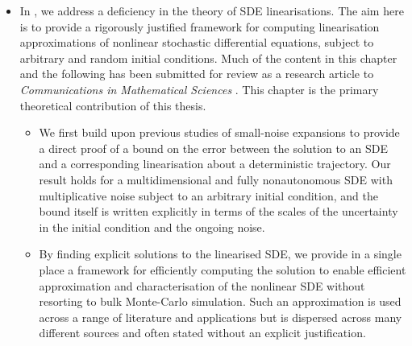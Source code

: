 \begin{itemize}
	\item In , we address a deficiency in the theory of SDE linearisations. %
	      The aim here is to provide a rigorously justified framework for computing linearisation approximations of nonlinear stochastic differential equations, subject to arbitrary and random initial conditions.
	      Much of the content in this chapter and the following  has been submitted for review as a research article to \emph{Communications in Mathematical Sciences} \citep{BlakeEtAl_2023_ConvergenceStochasticDifferential}.
	      This chapter is the primary theoretical contribution of this thesis.

	      \begin{itemize}
		      \item We first build upon previous studies of small-noise expansions \citep{Sanz-AlonsoStuart_2017_GaussianApproximationsSmall,Blagoveshchenskii_1962_DiffusionProcessesDepending,FreidlinWentzell_1998_RandomPerturbationsDynamical} to provide a direct proof of a bound on the error between the solution to an SDE and a corresponding linearisation about a deterministic trajectory.
		            Our result holds for a multidimensional and fully nonautonomous SDE with multiplicative noise subject to an arbitrary initial condition, and the bound itself is written explicitly in terms of the scales of the uncertainty in the initial condition and the ongoing noise.

		      \item By finding explicit solutions to the linearised SDE, we provide in a single place a framework for efficiently computing the solution to enable efficient approximation and characterisation of the nonlinear SDE without resorting to bulk Monte-Carlo simulation.
		            Such an approximation is used across a range of literature and applications \citep{Jazwinski_2014_StochasticProcessesFiltering,SarkkaSolin_2019_AppliedStochasticDifferential,KaszasHaller_2020_UniversalUpperEstimate,ArchambeauEtAl_2007_GaussianProcessApproximations,Sanz-AlonsoStuart_2017_GaussianApproximationsSmall,LawEtAl_2015_DataAssimilationMathematical,ReichCotter_2015_ProbabilisticForecastingBayesian,BudhirajaEtAl_2019_AssimilatingDataModels} but is dispersed across many different sources and often stated without an explicit justification.


\end{itemize}
\end{itemize}
